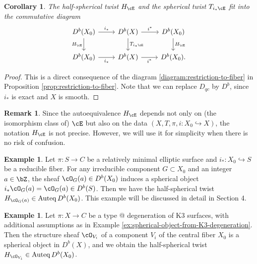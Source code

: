 \documentclass[12pt]{amsart}
\makeatletter
\numberwithin{equation}{section}
\theoremstyle{plain}
\newtheorem{corollary}[theorem]{Corollary}
\theoremstyle{definition}
\newtheorem{example}[theorem]{Example}
\newtheorem{remark}[theorem]{Remark}
\DeclareMathOperator{\Auteq}{\mathrm{Auteq}}
\newcommand*{\rom}[1]{\expandafter\@slowromancap\romannumeral #1@}
\makeatother
\begin{document}
\begin{corollary}\label{cor:compatibility-of-half-spherical-twists-and-spherical-twists}
    The half-spherical twist $H_{\cE}$ and the spherical twist $T_{i_*{\cE}}$ fit into the commutative diagram
    \begin{equation}
        \begin{tikzcd}
            D^b(X_0) \ar[r, "i_*"] \ar[d, "H_{\cE}"'] & D^b(X) \ar[r, "i^*"]\ar[d, "T_{i_*{\cE}}"] & D^b(X_0) \ar[d,  "H_{\cE}"]\\
            D^b(X_0) \ar[r, "i_*"'] & D^b(X) \ar[r, "i^*"'] & D^b(X_0).
        \end{tikzcd}
    \end{equation}
\end{corollary}
\begin{proof}
    This is a direct consequence of the diagram \eqref{diagram:restriction-to-fiber} in Proposition \ref{prop:restriction-to-fiber}.
    Note that we can replace $D_{qc}$ by $D^b$, since $i_*$ is exact and $X$ is smooth.
\end{proof}

\begin{remark}
    Since the autoequivalence $H_{\cE}$ depends not only on (the isomorphism class of) $\cE$ but also on the data $(X, T, \pi, i \colon X_0 \hookrightarrow X)$, the notation $H_{\cE}$ is not precise.
    However, we will use it for simplicity when there is no risk of confusion.
\end{remark}


\begin{example}\label{ex:half-spherical-twist-from-kodaira-fiber}
    Let $\pi \colon S \to C$ be a relatively minimal elliptic surface and $i_* \colon X_0 \hookrightarrow S$ be a reducible fiber.
    For any irreducible component $G \subset X_0$ and an integer $a \in \bZ$, the sheaf $\cO_G(a) \in D^b(X_0)$ induces a spherical object $i_*\cO_G(a)=\cO_G(a) \in D^b(S)$.
    Then we have the half-spherical twist $H_{\cO_G(a)} \in \Auteq D^b(X_0)$.
    This example will be discussed in detail in Section 4.
\end{example}


\begin{example}\label{ex:K3-degeneration}
    Let $\pi \colon X \to C$ be a type \rom{3} degeneration of K3 surfaces, with additional assumptions as in Example \ref{ex:spherical-object-from-K3-degeneration}.
    Then the structure sheaf $\cO_{V_i}$ of a component $V_i$ of the central fiber $X_0$ is a spherical object in $D^b(X)$, and we obtain the half-spherical twist $H_{\cO_{V_i}} \in \Auteq D^b(X_0)$.
\end{example}
\end{document}
